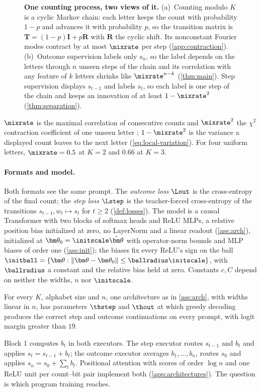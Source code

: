 \begin{figure}[t]
\centering
\resizebox{\linewidth}{!}{}
\caption{\textbf{One counting process, two views of it.}
(a)~Counting modulo $K$ is a cyclic Markov chain: each letter keeps the count with probability $1-p$ and advances it with probability
$p$, so the transition matrix is $\mathbf T=(1-p)\mathbf I+p\mathbf R$ with $\mathbf R$ the cyclic shift. Its nonconstant Fourier modes
contract by at most $\mixrate$ per step (\cref{app:contraction}).
(b)~Outcome supervision labels only $s_n$, so the label depends on the letters through $n$ unseen steps of the chain and its
correlation with any feature of $k$ letters shrinks like $\mixrate^{n-k}$ (\cref{thm:main}). Step supervision displays $s_{t-1}$ and labels $s_t$, so each label is one
step of the chain and keeps an innovation of at least $1-\mixrate^2$ (\cref{thm:separation}).}
\label{fig:chain}
\end{figure}

$\mixrate$ is the maximal correlation of consecutive counts and $\mixrate^2$ the $\chi^2$ contraction coefficient of one unseen letter
\citep{witsenhausen1975sequences,raginsky2016strong}; $1-\mixrate^2$ is the variance a displayed count leaves to the next letter
(\cref{eq:local-variation}). For four uniform letters, $\mixrate=0.5$ at $K=2$ and $0.66$ at $K=3$.

\paragraph{Formats and model.} Both formats see the same prompt. The \emph{outcome loss} $\Lout$ is the cross-entropy of the final
count; the \emph{step loss} $\Lstep$ is the teacher-forced cross-entropy of the transitions $s_{t-1},w_t\mapsto s_t$ for $t\ge2$
(\cref{def:losses}). The model is a causal Transformer with two blocks of softmax heads and ReLU MLPs, a relative position bias
initialized at zero, no LayerNorm and a linear readout (\cref{ass:arch}), initialized at $\bm\theta_0=\initscale\tilde{\bm\theta}$ with
operator-norm bounds and MLP biases of order one (\cref{ass:init}); the biases fix every ReLU's sign on the ball
$\initball=\{\bm\theta:\|\bm\theta-\bm\theta_0\|\le\ballradius\initscale\}$, with $\ballradius$ a constant and the relative bias held at zero. Constants $c,C$ depend on neither the widths, $n$ nor $\initscale$.

\begin{proposition}
\label{prop:represent}
For every $K$, alphabet size and $n$, one architecture as in \cref{ass:arch}, with widths linear in $n$, has parameters
$\thstep$ and $\thout$ at which greedy decoding produces the correct step and outcome continuations on every prompt, with
logit margin greater than $19$.
\end{proposition}
\label{sec:exact-programs}
Block 1 computes $b_t$ in both executors. The step executor routes $s_{t-1}$ and $b_t$ and applies $s_t=s_{t-1}+b_t$; the outcome executor
averages $b_1,\ldots,b_n$, routes $s_0$ and applies $s_n=s_0+\sum_tb_t$. Positional attention with scores of order $\log n$ and one ReLU
unit per count--bit pair implement both (\cref{app:architectures}). The question is which program training reaches.

